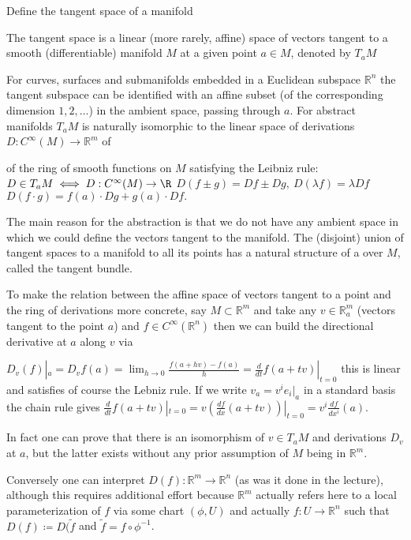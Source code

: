 Define the tangent space of a manifold

The tangent space is a linear (more rarely, affine) space of vectors tangent to a smooth (differentiable) manifold \( M \) at a given point \( a \in M \),
denoted by \( T_a M \)

For curves, surfaces and submanifolds embedded in a Euclidean subspace \( \mathbb{R}^n \) the tangent subspace can be identified with an affine subset 
(of the corresponding dimension \( 1,2,\dots \)) in the ambient space, passing through \( a \). 
For abstract manifolds \( T_aM \) is naturally isomorphic to the linear space of derivations \( D : C^\infty(M) \to \mathbb{R}^m \) of 

of the ring of smooth functions on \( M \) satisfying the Leibniz rule:
\(  D\in T_a M\iff D:C^\infty(M)\to\R\) 
\(D(f\pm g)=Df\pm Dg,\ D(\lambda f)=\lambda Df\) 
\(D(f\cdot g)=f(a)\cdot Dg+g(a)\cdot Df. \)

The main reason for the abstraction is that we do not have any ambient space in which we could define the vectors tangent to the manifold.
The (disjoint) union of tangent spaces to a manifold to all its points has a natural structure of a over \( M \), called the tangent bundle.

To make the relation between the affine space of vectors tangent to a point and the ring of derivations more concrete,
say \( M \subset \mathbb{R}^m \) and take any \( v \in \mathbb{R}_{a}^m \) (vectors tangent to the point \( a \)) 
and \( f \in C^{\infty}(\mathbb{R}^n) \) then we can build the directional derivative at \( a \) along \( v \) via

\( D_v(f)|_a = D_v f(a) = \lim_{h \to 0} \frac{f(a + hv) - f(a)}{h} = \frac{d}{dt} f(a + tv)|_{t=0} \)
this is linear and satisfies of course the Lebniz rule.
If we write \( v_a = v^i e_i|_a \) in a standard basis the chain rule gives
\( \frac{d}{dt} f(a + tv)|_{t=0} = v(\frac{df}{dx}(a + tv))|_{t=0} = v^i\frac{df}{dx^i}(a) \).

In fact one can prove that there is an isomorphism of \( v \in T_a M \) and derivations \( D_v \) at \( a \),
but the latter exists without any prior assumption of \( M \) being in \( \mathbb{R}^m \).

Conversely one can interpret \( D(f) : \mathbb{R}^m \to \mathbb{R}^n \) (as was it done in the lecture), although this requires
additional effort because \( \mathbb{R}^m \) actually refers here to a local parameterization of \( f \) via some chart
\( (\phi, U) \) and actually \( f : U \to \mathbb{R}^n \) such that \( D(f) \coloneqq D(\tilde{f} \) and \( \tilde{f} = f \circ \phi^{-1} \).

